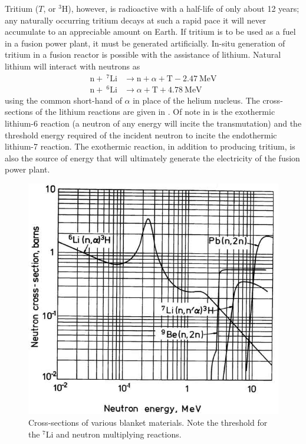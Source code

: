 Tritium ($T$, or $^3$H), however, is radioactive with a half-life of only about 12 years; any naturally occurring tritium decays at such a rapid pace it will never accumulate to an appreciable amount on Earth. If tritium is to be used as a fuel in a fusion power plant, it must be generated artificially. In-situ generation of tritium in a fusion reactor is possible with the assistance of lithium. Natural lithium will interact with neutrons as
\begin{subequations}\label{eq:lithium-t}
\begin{align}
	\mathrm{n} + \ ^7\mathrm{Li} &\xrightarrow \ \mathrm{n}+\alpha + \mathrm{T} -2.47\ \text{MeV}\label{eq:li7-t}\\
	\mathrm{n} + \ ^6\mathrm{Li} &\xrightarrow \  \alpha + \mathrm{T} +4.78\ \text{MeV} \label{eq:li6-t}
\end{align}
\end{subequations}
using the common short-hand of $\alpha$ in place of the helium nucleus. The cross-sections of the lithium reactions are given in . Of note in  is the exothermic lithium-6 reaction (a neutron of any energy will incite the transmutation) and the threshold energy required of the incident neutron to incite the endothermic lithium-7 reaction. The exothermic reaction, in addition to producing tritium, is also the source of energy that will ultimately generate the electricity of the fusion power plant.

\begin{figure}[ht]
	\centering
	\includegraphics[width=\singleimagewidth]{figures/breeding_xsecs} 
	\caption{Cross-sections of various blanket materials. Note the threshold for the $^7$Li and neutron multiplying reactions.}
	\label{fig:li-xsects}
\end{figure}

